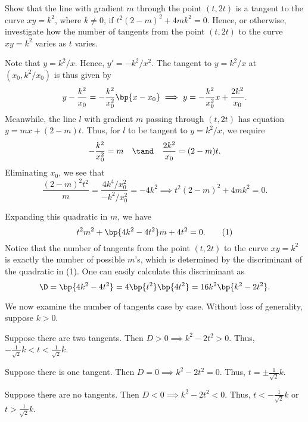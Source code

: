 \begin{problem}
    Show that the line with gradient $m$ through the point $(t, 2t)$ is a tangent to the curve $xy = k^2$, where $k \neq 0$, if $t^2 (2-m)^2 + 4mk^2 = 0$. Hence, or otherwise, investigate how the number of tangents from the point $(t, 2t)$ to the curve $xy = k^2$ varies as $t$ varies.
\end{problem}
\begin{solution}
    Note that $y = k^2/x$. Hence, $y' = -k^2/x^2$. The tangent to $y = k^2/x$ at $(x_0, k^2/x_0)$ is thus given by \[y - \frac{k^2}{x_0} = -\frac{k^2}{x_0^2} \bp{x - x_0} \implies y = -\frac{k^2}{x_0^2} x + \frac{2k^2}{x_0}.\] Meanwhile, the line $l$ with gradient $m$ passing through $(t, 2t)$ has equation $y = mx + (2-m)t$. Thus, for $l$ to be tangent to $y = k^2/x$, we require \[-\frac{k^2}{x_0^2} = m \quad \tand \quad \frac{2k^2}{x_0} = (2-m)t.\] Eliminating $x_0$, we see that \[\frac{(2-m)^2 t^2}{m} = \frac{4k^4 / x_0^2}{-k^2 / x_0^2} = -4k^2 \implies t^2 (2-m)^2 + 4mk^2 = 0.\]

    Expanding this quadratic in $m$, we have \[t^2 m^2 + \bp{4k^2 - 4t^2} m + 4t^2 = 0. \tag{1}\] Notice that the number of tangents from the point $(t, 2t)$ to the curve $xy = k^2$ is exactly the number of possible $m$'s, which is determined by the discriminant of the quadratic in (1). One can easily calculate this discriminant as \[\D = \bp{4k^2 - 4t^2} = 4\bp{t^2}\bp{4t^2} = 16k^2 \bp{k^2 - 2t^2}.\]

    We now examine the number of tangents case by case. Without loss of generality, suppose $k > 0$.

     Suppose there are two tangents. Then $D > 0 \implies k^2 - 2t^2 > 0$. Thus, $-\frac1{\sqrt 2} k < t < \frac1{\sqrt2} k$.

     Suppose there is one tangent. Then $D = 0 \implies k^2 - 2t^2 = 0$. Thus, $t = \pm \frac1{\sqrt2} k$.

     Suppose there are no tangents. Then $D < 0 \implies k^2 - 2t^2 < 0$. Thus, $t < -\frac1{\sqrt2} k$ or $t > \frac1{\sqrt2} k$.
\end{solution}

